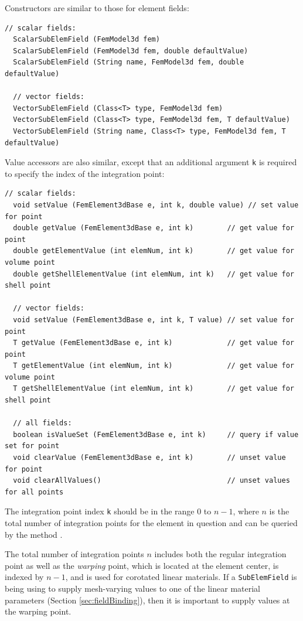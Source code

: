 Constructors are similar to those for element fields:
%
\begin{lstlisting}[]
  // scalar fields:
  ScalarSubElemField (FemModel3d fem)
  ScalarSubElemField (FemModel3d fem, double defaultValue)
  ScalarSubElemField (String name, FemModel3d fem, double defaultValue)

  // vector fields:
  VectorSubElemField (Class<T> type, FemModel3d fem)
  VectorSubElemField (Class<T> type, FemModel3d fem, T defaultValue)
  VectorSubElemField (String name, Class<T> type, FemModel3d fem, T defaultValue)
\end{lstlisting}
%
Value accessors are also similar, except that an additional argument
{\tt k} is required to specify the index of the integration
point: 
%
\begin{lstlisting}[]
  // scalar fields:
  void setValue (FemElement3dBase e, int k, double value) // set value for point
  double getValue (FemElement3dBase e, int k)        // get value for point
  double getElementValue (int elemNum, int k)        // get value for volume point
  double getShellElementValue (int elemNum, int k)   // get value for shell point

  // vector fields:
  void setValue (FemElement3dBase e, int k, T value) // set value for point
  T getValue (FemElement3dBase e, int k)             // get value for point
  T getElementValue (int elemNum, int k)             // get value for volume point
  T getShellElementValue (int elemNum, int k)        // get value for shell point

  // all fields:
  boolean isValueSet (FemElement3dBase e, int k)     // query if value set for point
  void clearValue (FemElement3dBase e, int k)        // unset value for point
  void clearAllValues()                              // unset values for all points
\end{lstlisting}
%
The integration point index {\tt k} should be in the range 0 to $n-1$,
where $n$ is the total number of integration points for the element in
question and can be queried by the method
.

\begin{sideblock}
The total number of integration points $n$ includes both the regular
integration point as well as the {\it warping} point, which is located
at the element center, is indexed by $n-1$, and is used for corotated
linear materials. If a {\tt SubElemField} is being using to supply
mesh-varying values to one of the linear material parameters (Section
\ref{sec:fieldBinding}), then it is important to supply values at the
warping point.
\end{sideblock}

